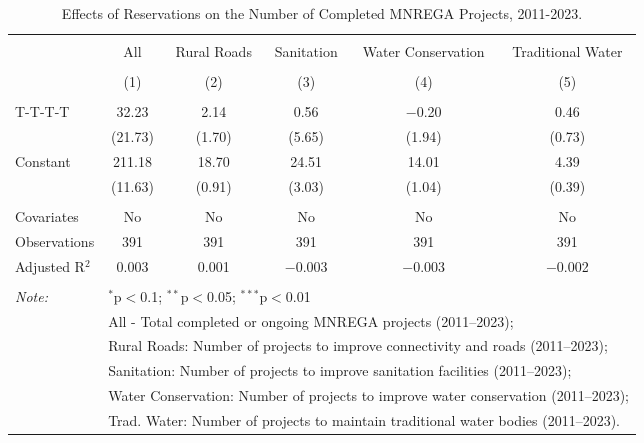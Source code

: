 
\begin{table}[!htbp] \centering 
  \caption{Effects of Reservations on the Number of Completed MNREGA Projects, 2011-2023.} 
  \label{main_mnrega_2011_2023} 
\begin{tabular}{@{\extracolsep{5pt}}lccccc} 
\\[-1.8ex]\hline 
\hline \\[-1.8ex] 
 & All & Rural Roads & Sanitation & Water Conservation & Traditional Water \\ 
\\[-1.8ex] & (1) & (2) & (3) & (4) & (5)\\ 
\hline \\[-1.8ex] 
 T-T-T-T & 32.23 & 2.14 & 0.56 & $-$0.20 & 0.46 \\ 
  & (21.73) & (1.70) & (5.65) & (1.94) & (0.73) \\ 
  Constant & 211.18 & 18.70 & 24.51 & 14.01 & 4.39 \\ 
  & (11.63) & (0.91) & (3.03) & (1.04) & (0.39) \\ 
 \hline \\[-1.8ex] 
Covariates & No & No & No & No & No \\ 
Observations & 391 & 391 & 391 & 391 & 391 \\ 
Adjusted R$^{2}$ & 0.003 & 0.001 & $-$0.003 & $-$0.003 & $-$0.002 \\ 
\hline 
\hline \\[-1.8ex] 
\textit{Note:}  & \multicolumn{5}{l}{$^{*}$p$<$0.1; $^{**}$p$<$0.05; $^{***}$p$<$0.01} \\ 
 & \multicolumn{5}{l}{All - Total completed or ongoing MNREGA projects (2011--2023);} \\ 
 & \multicolumn{5}{l}{Rural Roads: Number of projects to improve connectivity and roads (2011--2023);} \\ 
 & \multicolumn{5}{l}{Sanitation:  Number of projects to improve sanitation facilities  (2011--2023);} \\ 
 & \multicolumn{5}{l}{Water Conservation: Number of projects to improve water conservation (2011--2023);} \\ 
 & \multicolumn{5}{l}{Trad. Water: Number of projects to maintain traditional water bodies (2011--2023).} \\ 
\end{tabular} 
\end{table} 
